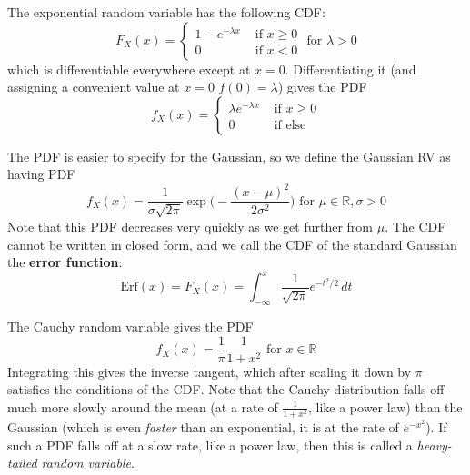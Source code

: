     \begin{example}
      The exponential random variable has the following CDF: 
      \begin{equation}
        F_X (x) = \begin{cases} 1 - e^{-\lambda x} & \text{ if } x \geq 0 \\ 0 & \text{ if } x < 0 \end{cases} \text{ for } \lambda > 0
      \end{equation}
      which is differentiable everywhere except at $x = 0$. Differentiating it (and assigning a convenient value at $x = 0$ $f(0) = \lambda$) gives the PDF 
      \begin{equation}
        f_X (x) = \begin{cases} \lambda e^{-\lambda x} & \text{ if } x \geq 0 \\ 0 & \text{ if else} \end{cases}
      \end{equation}
    \end{example}

    \begin{example}
      The PDF is easier to specify for the Gaussian, so we define the Gaussian RV as having PDF 
      \begin{equation}
        f_X (x) = \frac{1}{\sigma \sqrt{2 \pi}} \exp \bigg( -\frac{(x - \mu)^2}{2 \sigma^2} \bigg) \text{ for } \mu \in \mathbb{R}, \sigma > 0
      \end{equation}
      Note that this PDF decreases very quickly as we get further from $\mu$. The CDF cannot be written in closed form, and we call the CDF of the standard Gaussian the \textbf{error function}: 
      \begin{equation}
        \mathrm{Erf}(x) = F_X (x) = \int_{-\infty}^x \frac{1}{\sqrt{2 \pi}} e^{- t^2 / 2} \, dt
      \end{equation}
    \end{example}

    \begin{example}
      The Cauchy random variable gives the PDF 
      \begin{equation}
        f_X (x) = \frac{1}{\pi} \frac{1}{1 + x^2} \text{ for } x \in \mathbb{R}
      \end{equation}
      Integrating this gives the inverse tangent, which after scaling it down by $\pi$ satisfies the conditions of the CDF. Note that the Cauchy distribution falls off much more slowly around the mean (at a rate of $\frac{1}{1 + x^2}$, like a power law) than the Gaussian (which is even \textit{faster} than an exponential, it is at the rate of $e^{-x^2}$). If such a PDF falls off at a slow rate, like a power law, then this is called a \textit{heavy-tailed random variable}. 
    \end{example}

